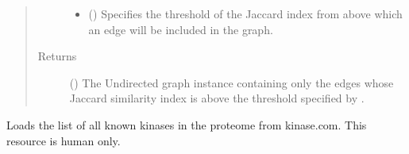 \documentclass[letterpaper,10pt,english]{sphinxmanual}
\begin{document}
\begin{fulllineitems}
\begin{fulllineitems}
\begin{quote}
\begin{description}
\begin{itemize}
\item {} 
 () \textendash{} Specifies the threshold of the Jaccard index from above
which an edge will be included in the graph.

\end{itemize}

\item[{Returns}] \leavevmode
() \textendash{} The Undirected graph instance containing
only the edges whose Jaccard similarity index is above the
threshold specified by .

\end{description}\end{quote}

\end{fulllineitems}


\begin{fulllineitems}
\label{\detokenize{main:pypath.main.PyPath.kegg_directions}}
\end{fulllineitems}


\begin{fulllineitems}
\label{\detokenize{main:pypath.main.PyPath.kegg_pathways}}
\end{fulllineitems}


\begin{fulllineitems}
\label{\detokenize{main:pypath.main.PyPath.kinase_stats}}
\end{fulllineitems}


\begin{fulllineitems}
\label{\detokenize{main:pypath.main.PyPath.kinases_list}}
Loads the list of all known kinases in the proteome from
kinase.com. This resource is human only.


\end{fulllineitems}
\end{fulllineitems}
\end{document}
